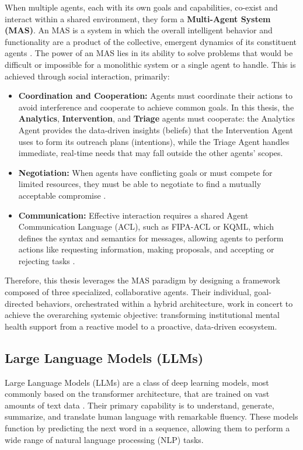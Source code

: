 When multiple agents, each with its own goals and capabilities, co-exist and interact within a shared environment, they form a \textbf{Multi-Agent System (MAS)}. An MAS is a system in which the overall intelligent behavior and functionality are a product of the collective, emergent dynamics of its constituent agents \cite{FIND_CITATION_PLEASE}. The power of an MAS lies in its ability to solve problems that would be difficult or impossible for a monolithic system or a single agent to handle. This is achieved through social interaction, primarily:
\begin{itemize}
    \item \textbf{Coordination and Cooperation:} Agents must coordinate their actions to avoid interference and cooperate to achieve common goals. In this thesis, the \textbf{Analytics}, \textbf{Intervention}, and \textbf{Triage} agents must cooperate: the Analytics Agent provides the data-driven insights (beliefs) that the Intervention Agent uses to form its outreach plans (intentions), while the Triage Agent handles immediate, real-time needs that may fall outside the other agents' scopes.
    \item \textbf{Negotiation:} When agents have conflicting goals or must compete for limited resources, they must be able to negotiate to find a mutually acceptable compromise \cite{FIND_CITATION_PLEASE}.
    \item \textbf{Communication:} Effective interaction requires a shared Agent Communication Language (ACL), such as FIPA-ACL or KQML, which defines the syntax and semantics for messages, allowing agents to perform actions like requesting information, making proposals, and accepting or rejecting tasks \cite{FIND_CITATION_PLEASE}.
\end{itemize}
Therefore, this thesis leverages the MAS paradigm by designing a framework composed of three specialized, collaborative agents. Their individual, goal-directed behaviors, orchestrated within a hybrid architecture, work in concert to achieve the overarching systemic objective: transforming institutional mental health support from a reactive model to a proactive, data-driven ecosystem.


\subsection{Large Language Models (LLMs)}
\label{subsec:llms}

Large Language Models (LLMs) are a class of deep learning models, most commonly based on the transformer architecture, that are trained on vast amounts of text data \cite{FIND_CITATION_PLEASE}. Their primary capability is to understand, generate, summarize, and translate human language with remarkable fluency. These models function by predicting the next word in a sequence, allowing them to perform a wide range of natural language processing (NLP) tasks.

